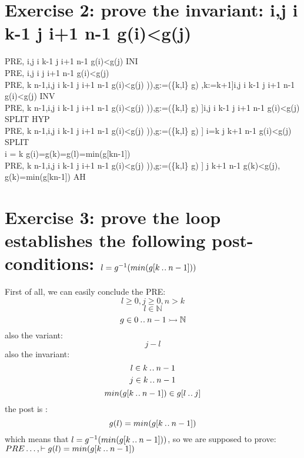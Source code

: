 \documentclass[11pt,a4paper,fleqn]{article}
\begin{document}
\section{Exercise 2: prove the invariant: \forall i,j \cdot i  \upto k-1 \wedge j \in i+1 \upto n-1 \Rightarrow g(i)<g(j)}
\noindent
PRE, \vdash [k:=0]\forall i,j \cdot i  \upto k-1 \wedge j \in i+1 \upto n-1 \Rightarrow g(i)<g(j) \; INI \\
PRE, \vdash \forall i,j \cdot i   \wedge j \in i+1 \upto n-1 \Rightarrow g(i)<g(j) \\
PRE, k \neq n-1,\forall i,j \cdot i  \upto k-1 \wedge j \in i+1 \upto n-1 \Rightarrow g(i)<g(j) \vdash [l:=g^{-1}(min(g[k\upto n-1])),g:=(\{k,l\} \domsub g) ,k:=k+1]\forall i,j \cdot i  \upto k-1 \wedge j \in i+1 \upto n-1 \Rightarrow g(i)<g(j) \; INV \\ 
PRE, k \neq n-1,\forall i,j \cdot i  \upto k-1 \wedge j \in i+1 \upto n-1 \Rightarrow g(i)<g(j) \vdash [l:=g^{-1}(min(g[k\upto n-1])),g:=(\{k,l\} \domsub g) ]\forall i,j \cdot i  \upto k-1 \wedge j \in i+1 \upto n-1 \Rightarrow g(i)<g(j) \;SPLIT \;HYP\\
PRE, k \neq n-1,\forall i,j \cdot i  \upto k-1 \wedge j \in i+1 \upto n-1 \Rightarrow g(i)<g(j) \vdash [l:=g^{-1}(min(g[k\upto n-1])),g:=(\{k,l\} \domsub g) ] i=k \wedge j \in k+1 \upto n-1 \Rightarrow g(i)<g(j) \;SPLIT \\
i = k \vdash g(i)=g(k)=g(l)=min(g[k\upto n-1]) \\
PRE, k \neq n-1,\forall i,j \cdot i  \upto k-1 \wedge j \in i+1 \upto n-1 \Rightarrow g(i)<g(j) \vdash [l:=g^{-1}(min(g[k\upto n-1])),g:=(\{k,l\} \domsub g) ] j \in k+1 \upto n-1 \Rightarrow g(k)<g(j), g(k)=min(g[k\upto n-1]) \; AH \\

\section{Exercise 3: prove the loop establishes the following post-conditions: $ l = g^{-1}(min(g[k \mathbin{.\mkern1mu.} n-1])) $}
\noindent
First of all, we can easily conclude the PRE:\\
$$l \ge 0, j \ge 0, n > k $$ $$l \in \mathbb{N}$$ 
$$ g \in 0 \mathbin{.\mkern1mu.} n-1 \rightarrowtail \mathbb{N}$$
also the variant: \\
$$ j-l$$
also the invariant:\\
$$ l \in k \mathbin{.\mkern1mu.} n-1 $$ $$j \in k \mathbin{.\mkern1mu.} n-1 $$
$$min(g[k \mathbin{.\mkern1mu.} n-1]) \in g[l \mathbin{.\mkern1mu.} j] $$
the post is :\\
$$ g(l) = min(g[k \mathbin{.\mkern1mu.} n-1])$$ 
which means that $l = g^{-1}(min(g[k \mathbin{.\mkern1mu.} n-1]))$, so we are supposed to prove:\\
$ PRE \ldots,\vdash g(l) = min(g[k \mathbin{.\mkern1mu.} n-1])$\\
\end{document}
